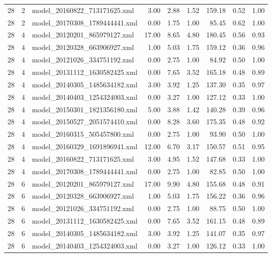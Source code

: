 \begin{table}[ht]
\begin{tabular}{rrlrrrrrr}
   28 &   2 & model\_20160822\_713171625.xml & 3.00 & 2.88 & 1.52 & 159.18 & 0.52 & 1.00 \\ 
   28 &   2 & model\_20170308\_1789444441.xml & 0.00 & 1.75 & 1.00 & 85.45 & 0.62 & 1.00 \\ 
   28 &   4 & model\_20120201\_865979127.xml & 17.00 & 8.65 & 4.80 & 180.45 & 0.56 & 0.93 \\ 
   28 &   4 & model\_20120328\_663906927.xml & 1.00 & 5.03 & 1.75 & 159.12 & 0.36 & 0.96 \\ 
   28 &   4 & model\_20121026\_334751192.xml & 0.00 & 2.75 & 1.00 & 84.92 & 0.50 & 1.00 \\ 
   28 &   4 & model\_20131112\_1630582425.xml & 0.00 & 7.65 & 3.52 & 165.18 & 0.48 & 0.89 \\ 
   28 &   4 & model\_20140305\_1485634182.xml & 3.00 & 3.92 & 1.25 & 137.30 & 0.35 & 0.97 \\ 
   28 &   4 & model\_20140403\_1254324003.xml & 0.00 & 3.27 & 1.00 & 127.12 & 0.33 & 1.00 \\ 
   28 &   4 & model\_20150301\_1821356180.xml & 5.00 & 3.88 & 1.42 & 140.28 & 0.39 & 0.96 \\ 
   28 &   4 & model\_20150527\_2051574410.xml & 0.00 & 8.28 & 3.60 & 175.35 & 0.48 & 0.92 \\ 
   28 &   4 & model\_20160315\_505457800.xml & 0.00 & 2.75 & 1.00 & 93.90 & 0.50 & 1.00 \\ 
   28 &   4 & model\_20160329\_1691896941.xml & 12.00 & 6.70 & 3.17 & 150.57 & 0.51 & 0.95 \\ 
   28 &   4 & model\_20160822\_713171625.xml & 3.00 & 4.95 & 1.52 & 147.68 & 0.33 & 1.00 \\ 
   28 &   4 & model\_20170308\_1789444441.xml & 0.00 & 2.75 & 1.00 & 82.85 & 0.50 & 1.00 \\ 
   28 &   6 & model\_20120201\_865979127.xml & 17.00 & 9.90 & 4.80 & 155.68 & 0.48 & 0.91 \\ 
   28 &   6 & model\_20120328\_663906927.xml & 1.00 & 5.03 & 1.75 & 156.22 & 0.36 & 0.96 \\ 
   28 &   6 & model\_20121026\_334751192.xml & 0.00 & 2.75 & 1.00 & 88.75 & 0.50 & 1.00 \\ 
   28 &   6 & model\_20131112\_1630582425.xml & 0.00 & 7.65 & 3.52 & 161.15 & 0.48 & 0.89 \\ 
   28 &   6 & model\_20140305\_1485634182.xml & 3.00 & 3.92 & 1.25 & 141.07 & 0.35 & 0.97 \\ 
   28 &   6 & model\_20140403\_1254324003.xml & 0.00 & 3.27 & 1.00 & 126.12 & 0.33 & 1.00 \\ 

\end{tabular}
\end{table}

